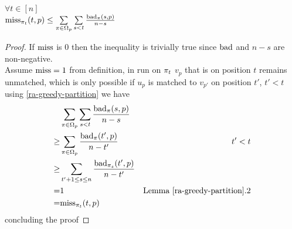 \begin{lemma}
	\label{ra-greedy-bgm-2}
	$\forall t\in[n]$\\
	$\mathrm{miss}_{\pi_t}(t,p)\leq\sum\limits_{\pi\in\Omega_p}\sum\limits_{s<t}\frac{\mathrm{bad}_\pi(s,p)}{n-s}$
\end{lemma}
\begin{proof}
	If $\mathrm{miss}$ is $0$ then the inequality is trivially true since $\mathrm{bad}$ and $n-s$ are non-negative.\\ Assume $\mathrm{miss}=1$ from definition, in run on $\pi_t$ $v_p$ that is on position $t$ remains unmatched, which is only possible if $u_p$ is matched to $v_{p'}$ on position $t'$, $t'<t$ using \autoref{ra-greedy-partition} we have
	\begin{align*}
		& \sum\limits_{\pi\in\Omega_p}\sum\limits_{s<t}\frac{\mathrm{bad}_\pi(s,p)}{n-s} & \\
		\geq & \sum\limits_{\pi\in\Omega_p}\frac{\mathrm{bad}_\pi(t',p)}{n-t'}&t'<t\\
		\geq & \sum\limits_{t'+1\leq s\leq n}\frac{\mathrm{bad}_{\pi_s}(t',p)}{n-t'}\\
		= & 1 & \text{Lemma }\ref{ra-greedy-partition}.2\\
		= & \mathrm{miss}_{\pi_t}(t,p)
	\end{align*}
	concluding the proof
\end{proof}

